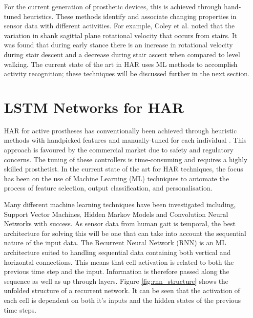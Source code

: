 \documentclass[sensors,article,submit,moreauthors,pdftex]{Definitions/mdpi}
\begin{document}
For the current generation of prosthetic devices, this is achieved through hand-tuned heuristics. These methods identify and associate changing properties in sensor data with different activities. For example, Coley et al. noted that the variation in shank sagittal plane rotational velocity that occurs from stairs\cite{Coley2005}. It was found that during early stance there is an increase in rotational velocity during stair descent and a decrease during stair ascent when compared to level walking. The current state of the art in HAR uses ML methods to accomplish activity recognition; these techniques will be discussed further in the next section.




\section{LSTM Networks for HAR} 
\label{sec:lstm_therory}
HAR for active prostheses has conventionally been achieved through heuristic methods with handpicked features and manually-tuned for each individual \cite{Maqbool2017, Xu2018}. This approach is favoured by the commercial market due to safety and regulatory concerns\cite{Fluit2020}.  The tuning of these controllers is time-consuming and requires a highly skilled prosthetist. In the current state of the art for HAR techniques, the focus has been on the use of Machine Learning (ML) techniques to automate the process of feature selection, output classification, and personalisation\cite{Labarriere2020}.

Many different machine learning techniques have been investigated including, Support Vector Machines, Hidden Markov Models and Convolution Neural Networks with success\cite{Labarriere2020}. As sensor data from human gait is temporal, the best architecture for solving this will be one that can take into account the sequential nature of the input data. The Recurrent Neural Network (RNN) is an ML architecture suited to handling sequential data containing both vertical and horizontal connections. This means that cell activation is related to both the previous time step and the input. Information is therefore passed along the sequence as well as up through layers. Figure \ref{fig:rnn_structure} shows the unfolded structure of a recurrent network. It can be seen that the activation of each cell is dependent on both it's inputs and the hidden states of the previous time steps.
\end{document}
